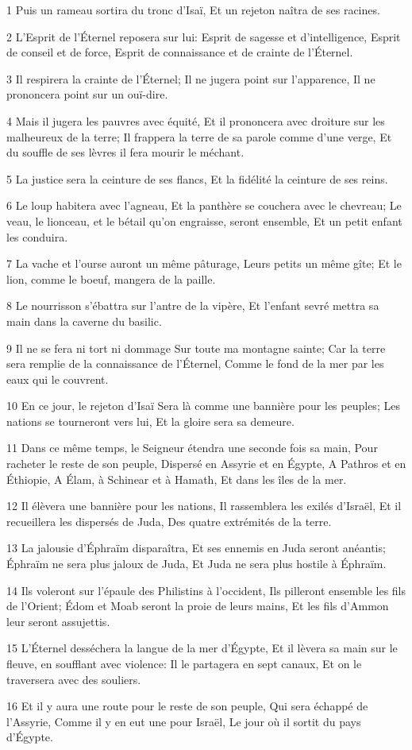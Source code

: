 \par 1 Puis un rameau sortira du tronc d'Isaï, Et un rejeton naîtra de ses racines.
\par 2 L'Esprit de l'Éternel reposera sur lui: Esprit de sagesse et d'intelligence, Esprit de conseil et de force, Esprit de connaissance et de crainte de l'Éternel.
\par 3 Il respirera la crainte de l'Éternel; Il ne jugera point sur l'apparence, Il ne prononcera point sur un ouï-dire.
\par 4 Mais il jugera les pauvres avec équité, Et il prononcera avec droiture sur les malheureux de la terre; Il frappera la terre de sa parole comme d'une verge, Et du souffle de ses lèvres il fera mourir le méchant.
\par 5 La justice sera la ceinture de ses flancs, Et la fidélité la ceinture de ses reins.
\par 6 Le loup habitera avec l'agneau, Et la panthère se couchera avec le chevreau; Le veau, le lionceau, et le bétail qu'on engraisse, seront ensemble, Et un petit enfant les conduira.
\par 7 La vache et l'ourse auront un même pâturage, Leurs petits un même gîte; Et le lion, comme le boeuf, mangera de la paille.
\par 8 Le nourrisson s'ébattra sur l'antre de la vipère, Et l'enfant sevré mettra sa main dans la caverne du basilic.
\par 9 Il ne se fera ni tort ni dommage Sur toute ma montagne sainte; Car la terre sera remplie de la connaissance de l'Éternel, Comme le fond de la mer par les eaux qui le couvrent.
\par 10 En ce jour, le rejeton d'Isaï Sera là comme une bannière pour les peuples; Les nations se tourneront vers lui, Et la gloire sera sa demeure.
\par 11 Dans ce même temps, le Seigneur étendra une seconde fois sa main, Pour racheter le reste de son peuple, Dispersé en Assyrie et en Égypte, A Pathros et en Éthiopie, A Élam, à Schinear et à Hamath, Et dans les îles de la mer.
\par 12 Il élèvera une bannière pour les nations, Il rassemblera les exilés d'Israël, Et il recueillera les dispersés de Juda, Des quatre extrémités de la terre.
\par 13 La jalousie d'Éphraïm disparaîtra, Et ses ennemis en Juda seront anéantis; Éphraïm ne sera plus jaloux de Juda, Et Juda ne sera plus hostile à Éphraïm.
\par 14 Ils voleront sur l'épaule des Philistins à l'occident, Ils pilleront ensemble les fils de l'Orient; Édom et Moab seront la proie de leurs mains, Et les fils d'Ammon leur seront assujettis.
\par 15 L'Éternel desséchera la langue de la mer d'Égypte, Et il lèvera sa main sur le fleuve, en soufflant avec violence: Il le partagera en sept canaux, Et on le traversera avec des souliers.
\par 16 Et il y aura une route pour le reste de son peuple, Qui sera échappé de l'Assyrie, Comme il y en eut une pour Israël, Le jour où il sortit du pays d'Égypte.

